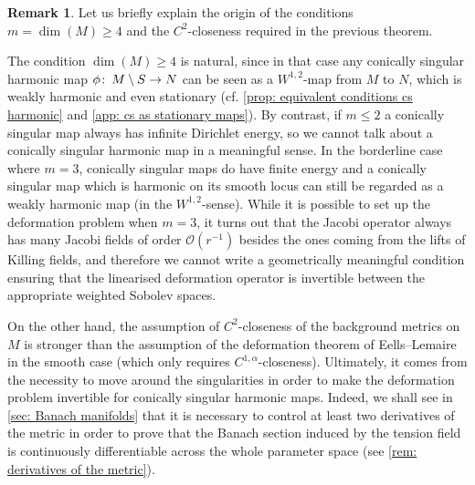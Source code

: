 \documentclass{article}
\numberwithin{equation}{section}        %
\theoremstyle{bfnote}
\theoremstyle{definition}
\theoremstyle{bfremark}
\newtheorem{rem}[thm]{Remark}               %
\newcommand{\col}{\colon \thinspace}        %
\begin{document}
\begin{rem}
    Let us briefly explain the origin of the conditions $m = \dim(M) \geq 4$ and the $C^2$-closeness required in the previous theorem.

    The condition $\dim(M) \geq 4$ is natural, since in that case any conically singular harmonic map $\phi \col M \setminus S \to N$ can be seen as a $W^{1,2}$-map from $M$ to $N$, which is weakly harmonic and even stationary (cf. \cref{prop: equivalent conditions cs harmonic} and \cref{app: cs as stationary maps}). By contrast, if $m \leq 2$ a conically singular map always has infinite Dirichlet energy, so we cannot talk about a conically singular harmonic map in a meaningful sense. In the borderline case where $m = 3$, conically singular maps do have finite energy and a conically singular map which is harmonic on its smooth locus can still be regarded as a weakly harmonic map (in the $W^{1,2}$-sense). While it is possible to set up the deformation problem when $m = 3$, it turns out that the Jacobi operator always has many Jacobi fields of order $\mathcal{O}(r^{-1})$ besides the ones coming from the lifts of Killing fields, and therefore we cannot write a geometrically meaningful condition ensuring that the linearised deformation operator is invertible between the appropriate weighted Sobolev spaces.

    On the other hand, the assumption of $C^2$-closeness of the background metrics on $M$ is stronger than the assumption of the deformation theorem of Eells--Lemaire in the smooth case (which only requires $C^{1,\alpha}$-closeness). Ultimately, it comes from the necessity to move around the singularities in order to make the deformation problem invertible for conically singular harmonic maps. Indeed, we shall see in \cref{sec: Banach manifolds} that it is necessary to control at least two derivatives of the metric in order to prove that the Banach section induced by the tension field is continuously differentiable across the whole parameter space (see \cref{rem: derivatives of the metric}).
\end{rem}
\end{document}
